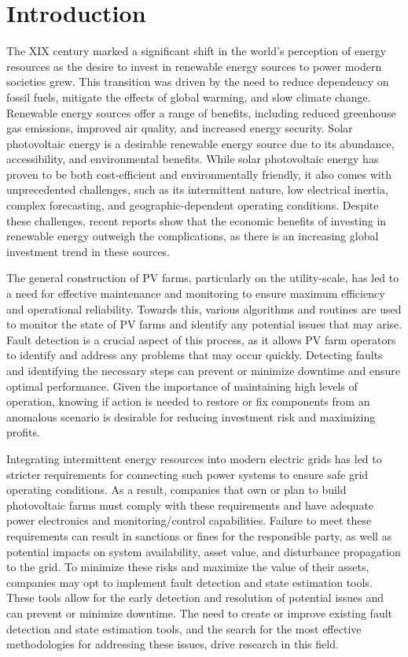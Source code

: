 \chapter{Introduction} \label{chap:chap1}


The XIX century marked a significant shift in the world's perception of energy resources as the desire to invest in renewable energy sources to power modern societies grew. This transition was driven by the need to reduce dependency on fossil fuels, mitigate the effects of global warming, and slow climate change. Renewable energy sources offer a range of benefits, including reduced greenhouse gas emissions, improved air quality, and increased energy security. Solar photovoltaic energy is a desirable renewable energy source due to its abundance, accessibility, and environmental benefits. While solar photovoltaic energy has proven to be both cost-efficient and environmentally friendly, it also comes with unprecedented challenges, such as its intermittent nature, low electrical inertia, complex forecasting, and geographic-dependent operating conditions. Despite these challenges, recent reports \cite{cap} show that the economic benefits of investing in renewable energy outweigh the complications, as there is an increasing global investment trend in these sources.

The general construction of PV farms, particularly on the utility-scale, has led to a need for effective maintenance and monitoring to ensure maximum efficiency and operational reliability. Towards this, various algorithms and routines are used to monitor the state of PV farms and identify any potential issues that may arise. Fault detection is a crucial aspect of this process, as it allows PV farm operators to identify and address any problems that may occur quickly. Detecting faults and identifying the necessary steps can prevent or minimize downtime and ensure optimal performance. Given the importance of maintaining high levels of operation, knowing if action is needed to restore or fix components from an anomalous scenario is desirable for reducing investment risk and maximizing profits.

Integrating intermittent energy resources into modern electric grids has led to stricter requirements for connecting such power systems to ensure safe grid operating conditions. As a result, companies that own or plan to build photovoltaic farms must comply with these requirements and have adequate power electronics and monitoring/control capabilities. Failure to meet these requirements can result in sanctions or fines for the responsible party, as well as potential impacts on system availability, asset value, and disturbance propagation to the grid. To minimize these risks and maximize the value of their assets, companies may opt to implement fault detection and state estimation tools. These tools allow for the early detection and resolution of potential issues and can prevent or minimize downtime. The need to create or improve existing fault detection and state estimation tools, and the search for the most effective methodologies for addressing these issues, drive research in this field.

